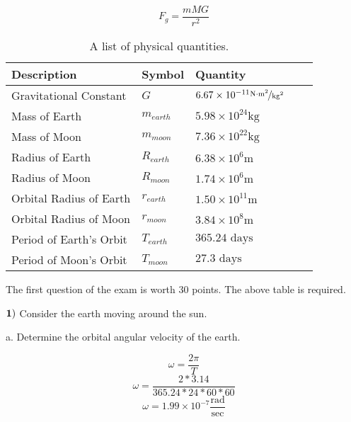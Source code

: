 \documentclass{article}
\begin{document}
   $$F_g=\frac{mMG}{r^2}$$
   \begin{table}[htbp]
\begin{center}
\footnotesize
\begin{tabular}{lllll}
\toprule
 Description              & Symbol          & Quantity                                                                \\
\midrule
  Gravitational Constant   & $G$             & $6.67 \times 10^{-11} \nicefrac{ \text{N}\cdot\text{m}^2}{\text{kg}^2}$ \\
    Mass of Earth   & $m_{earth}$           & $5.98\times 10^{24} \text{kg}$    \\
    Mass of Moon   & $m_{moon}$           & $7.36\times 10^{22} \text{kg}$    \\
    Radius of Earth     & $R_{earth}$           & $6.38 \times 10^{6} \text{m}$                   \\
     Radius of Moon    & $R_{moon}$           & $1.74 \times 10^{6} \text{m}$                   \\
     Orbital Radius of Earth    & $r_{earth}$           & $1.50 \times 10^{11} {\text{m}}$                   \\
     Orbital Radius of Moon    & $r_{moon}$           & $3.84 \times 10^{8} \text{m}$                   \\
      Period of Earth's Orbit     & $T_{earth}$ &   $365.24\text{ days}$                    \\
    Period of Moon's Orbit     & $T_{moon}$ &   $27.3\text{ days}$                    \\
                                     

\bottomrule
\end{tabular}
\end{center}
  \caption{A list of physical quantities.}
  \label{tab:font-sizes}
\end{table}

\newpage

The first question of the exam is worth 30 points.  The above table is required. 

 $\bf{1)}$ Consider the earth moving around the sun.
 
  \vspace{1cm}
 
 a.  Determine the orbital angular velocity of the earth.
 
 $$\omega=\frac{2\pi}{T}$$
 $$\omega=\frac{2*3.14}{365.24*24*60*60}$$
 $$\omega=1.99 \times 10^{-7} \frac{\text{rad}}{\text{sec}}$$
 
\end{document}
